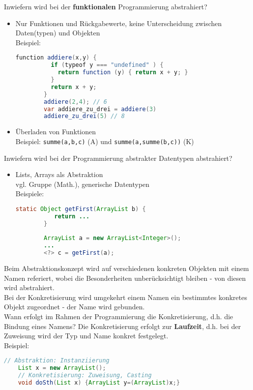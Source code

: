\begin{card}
	Inwiefern wird bei der \textbf{funktionalen} Programmierung abstrahiert?
	\hr
	\begin{itemize}
	\item Nur Funktionen und Rückgabewerte, keine Unterscheidung zwischen Daten(typen) und  Objekten\\
		Beispiel:
		\begin{lstlisting}[language=Java] 
		function addiere(x,y) {
		  if (typeof y === "undefined" ) {
		    return function (y) { return x + y; }
		  }
		  return x + y;
		}
		addiere(2,4); // 6 
		var addiere_zu_drei = addiere(3)
		addiere_zu_drei(5) // 8
		\end{lstlisting}
	\item Überladen von Funktionen\\
		Beispiel: \texttt{summe(a,b,c)} (A) und \texttt{summe(a,summe(b,c))} (K)
	\end{itemize}
\end{card}

\begin{card}
	Inwiefern wird bei der Programmierung abstrakter Datentypen abstrahiert?
	\hr
	\begin{itemize}
	\item Lists, Arrays als Abstraktion\\
		vgl. Gruppe (Math.), generische Datentypen\\
		Beispiele: 
		\begin{lstlisting}[language=Java] 
		static Object getFirst(ArrayList b) {
		   return ...
		}
		
		ArrayList a = new ArrayList<Integer>();
		...
		<?> c = getFirst(a);
		\end{lstlisting}
	\end{itemize}
\end{card}

\begin{card}
	Beim Abstraktionskonzept wird auf verschiedenen konkreten Objekten mit einem Namen referiert, wobei die Besonderheiten unberücksichtigt bleiben - von diesen wird abstrahiert.\\
	Bei der Konkretisierung wird umgekehrt einem Namen ein bestimmtes konkretes Objekt zugeordnet - der Name wird gebunden.\\
	Wann erfolgt im Rahmen der Programmierung die Konkretisierung, d.h. die Bindung	eines Namens?
	\hr
	Die Konkretisierung erfolgt zur \textbf{Laufzeit}, d.h. bei der Zuweisung wird der Typ und Name konkret festgelegt.\\
	Beispiel:
	\begin{lstlisting}[language=Java]
	// Abstraktion: Instanziierung
	List x = new ArrayList();
	// Konkretisierung: Zuweisung, Casting
	void doSth(List x) {ArrayList y=(ArrayList)x;}
	\end{lstlisting}
\end{card}

